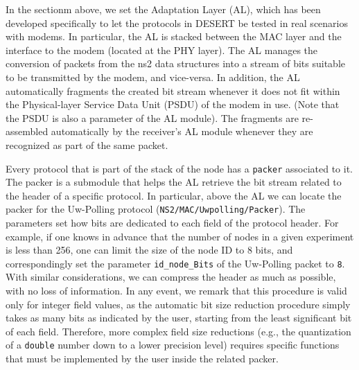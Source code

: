 \documentclass[11pt]{article}
\begin{document}
In the sectionm above, we set the Adaptation Layer (AL), which has been developed specifically to let the protocols in DESERT be tested in real scenarios with modems. In particular, the AL is stacked between the MAC layer and the interface to the modem (located at the PHY layer). The AL manages the conversion of packets from the ns2 data structures into a stream of bits suitable to be transmitted by the modem, and vice-versa. In addition, the AL automatically fragments the created bit stream whenever it does not fit within the Physical-layer Service Data Unit (PSDU) of the modem in use. (Note that the PSDU is also a parameter of the AL module). The fragments are re-assembled automatically by the receiver's AL module whenever they are recognized as part of the same packet.

Every protocol that is part of the stack of the node has a {\tt packer} associated to it. The packer is a submodule that helps the AL retrieve the bit stream related to the header of a specific protocol. In particular, above the AL we can locate the packer for the Uw-Polling protocol ({\tt NS2/MAC/Uwpolling/Packer}). The parameters set how bits are dedicated to each field of the protocol header. 
For example, if one knows in advance that the number of nodes in a given experiment is less than 256, one can limit the size of the node ID to 8 bits, and correspondingly set the parameter {\tt id\_node\_Bits} of the Uw-Polling packet to {\tt 8}.
With similar considerations, we can compress the header as much as possible, with no loss of information. In any event, we remark that this procedure is valid only for integer field values, as the automatic bit size reduction procedure simply takes as many bits as indicated by the user, starting from the least significant bit of each field. Therefore, more complex field size reductions (e.g., the quantization of a {\tt double} number down to a lower precision level) requires specific functions that must be implemented by the user inside the related packer.
\end{document}
